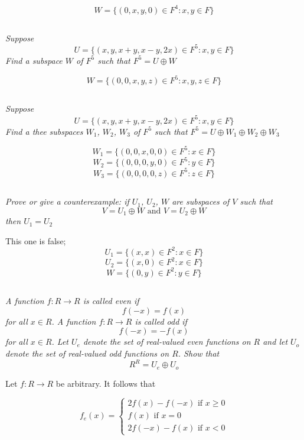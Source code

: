 \documentclass[11pt,oneside,titlepage]{book}
\begin{document}
$$W = \{(0, x, y, 0) \in F^4: x, y \in F\}$$


\subsection{}

\textit{Suppose}
$$U = \{(x, y, x + y, x - y, 2x) \in F^5: x, y \in F\}$$
\textit{Find a subspace $W$ of $F^5$ such that $F^5 = U \oplus W$ }

$$W = \{(0, 0, x, y, z) \in F^5: x, y, z \in F\}$$

\subsection{}

\textit{Suppose}
$$U = \{(x, y, x + y, x - y, 2x) \in F^5: x, y \in F\}$$
\textit{Find a thee subspaces $W_1$, $W_2$, $W_3$ of $F^5$
  such that $F^5 = U \oplus W_1 \oplus W_2 \oplus W_3$ }

$$W_1 = \{(0, 0, x, 0, 0) \in F^5: x \in F\}$$
$$W_2 = \{(0, 0, 0, y, 0) \in F^5: y \in F\}$$
$$W_3 = \{(0, 0, 0, 0, z) \in F^5: z \in F\}$$

\subsection{}

\textit{Prove or give a counterexample: if $U_1$, $U_2$, $W$ are subspaces
  of $V$ such that }
$$ V = U_1 \oplus W \text{ and } V = U_2 \oplus W $$
\textit{then $U_1 = U_2$}

This one is false;
$$U_1 = \{(x, x) \in F^2: x \in F\}$$
$$U_2 = \{(x, 0) \in F^2: x \in F\}$$
$$W = \{(0, y) \in F^2: y \in F\}$$

\subsection{}

\textit{A function $f: R \to R$ is called even if }
$$f(-x) = f(x)$$
\textit{for all $x \in R$. A function $f: R \to R$ is called odd if }
$$f(-x) = -f(x)$$
\textit{for all $x \in R$. Let $U_e$ denote the set of real-valued
  even functions on $R$ and let $U_o$ denote the set of real-valued odd
  functions on $R$. Show that }
$$R^R = U_e \oplus U_o$$



Let $f: R \to R$ be arbitrary. It follows that

$$f_e(x) =
\begin{cases}
  2 f(x) - f(-x) \text{ if } x \geq 0 \\
  f(x) \text{ if } x = 0 \\
  2 f(-x) - f(x) \text{ if } x < 0
\end{cases}
$$
\end{document}
